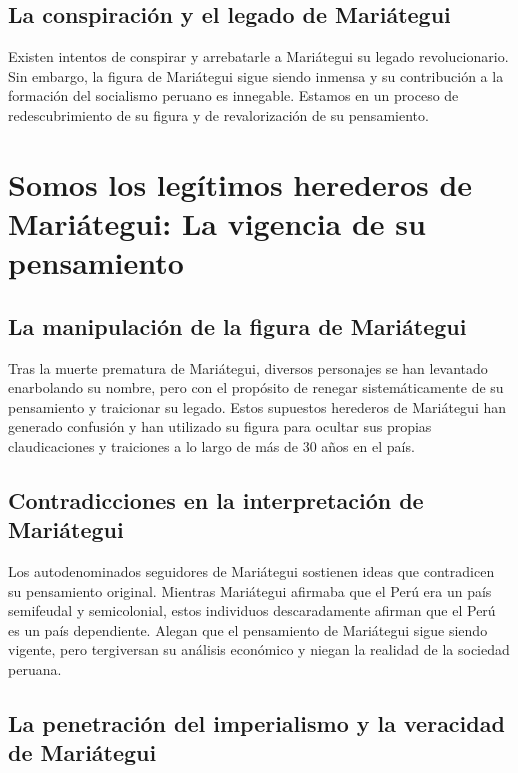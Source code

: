 \documentclass[
  jou,
  floatsintext,
  longtable,
  a4paper,
  nolmodern,
  notxfonts,
  notimes,
  12pt,
  colorlinks=true,linkcolor=blue,citecolor=blue,urlcolor=blue]{apa7}
\begin{document}
\subsection{La conspiración y el legado de
Mariátegui}\label{la-conspiraciuxf3n-y-el-legado-de-mariuxe1tegui}

Existen intentos de conspirar y arrebatarle a Mariátegui su legado
revolucionario. Sin embargo, la figura de Mariátegui sigue siendo
inmensa y su contribución a la formación del socialismo peruano es
innegable. Estamos en un proceso de redescubrimiento de su figura y de
revalorización de su pensamiento.

\section{Somos los legítimos herederos de Mariátegui: La vigencia de su
pensamiento}\label{somos-los-leguxedtimos-herederos-de-mariuxe1tegui-la-vigencia-de-su-pensamiento}

\subsection{La manipulación de la figura de
Mariátegui}\label{la-manipulaciuxf3n-de-la-figura-de-mariuxe1tegui}

Tras la muerte prematura de Mariátegui, diversos personajes se han
levantado enarbolando su nombre, pero con el propósito de renegar
sistemáticamente de su pensamiento y traicionar su legado. Estos
supuestos herederos de Mariátegui han generado confusión y han utilizado
su figura para ocultar sus propias claudicaciones y traiciones a lo
largo de más de 30 años en el país.

\subsection{Contradicciones en la interpretación de
Mariátegui}\label{contradicciones-en-la-interpretaciuxf3n-de-mariuxe1tegui}

Los autodenominados seguidores de Mariátegui sostienen ideas que
contradicen su pensamiento original. Mientras Mariátegui afirmaba que el
Perú era un país semifeudal y semicolonial, estos individuos
descaradamente afirman que el Perú es un país dependiente. Alegan que el
pensamiento de Mariátegui sigue siendo vigente, pero tergiversan su
análisis económico y niegan la realidad de la sociedad peruana.

\subsection{La penetración del imperialismo y la veracidad de
Mariátegui}\label{la-penetraciuxf3n-del-imperialismo-y-la-veracidad-de-mariuxe1tegui}
\end{document}
